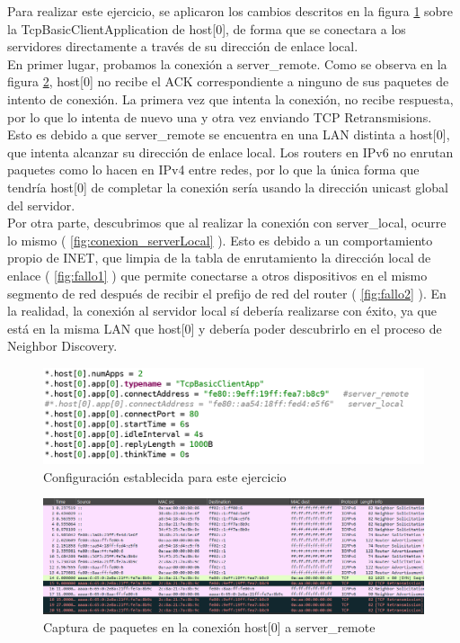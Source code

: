 Para realizar este ejercicio, se aplicaron los cambios descritos en la figura \ref{fig:conf_linklocalTCP} sobre la TcpBasicClientApplication de host[0], de forma que se conectara a los servidores directamente a través de su dirección de enlace local.\\
En primer lugar, probamos la conexión a server\_remote. Como se observa en la figura \ref{fig:conexion_serverRemote}, host[0] no recibe el ACK correspondiente a ninguno de sus paquetes de intento de conexión. La primera vez que intenta la conexión, no recibe respuesta, por lo que lo intenta de nuevo una y otra vez enviando TCP Retransmisions. Esto es debido a que server\_remote se encuentra en una LAN distinta a host[0], que intenta alcanzar su dirección de enlace local. Los routers en IPv6 no enrutan paquetes como lo hacen en IPv4 entre redes, por lo que la única forma que tendría host[0] de completar la conexión sería usando la dirección unicast global del servidor.\\
Por otra parte, descubrimos que al realizar la conexión con server\_local, ocurre lo mismo ( \ref{fig:conexion_serverLocal} ). Esto es debido a un comportamiento propio de INET, que limpia de la tabla de enrutamiento la dirección local de enlace ( \ref{fig:fallo1} ) que permite conectarse a otros dispositivos en el mismo segmento de red después de recibir el prefijo de red del router ( \ref{fig:fallo2} ). En la realidad, la conexión al servidor local sí debería realizarse con éxito, ya que está en la misma LAN que host[0] y debería poder descubrirlo en el proceso de Neighbor Discovery.

\begin{figure}[H]
    \centering
    \includegraphics[width=135mm, scale=0.75]{imaxes/ejercicio2_7_1.png}
    \caption{Configuración establecida para este ejercicio}
    \label{fig:conf_linklocalTCP}
\end{figure}

\begin{figure}[H]
    \centering
    \includegraphics[width=135mm, scale=0.75]{imaxes/ejercicio2_7_3.png}
    \caption{Captura de paquetes en la conexión host[0] a server\_remote}
    \label{fig:conexion_serverRemote}
\end{figure}

